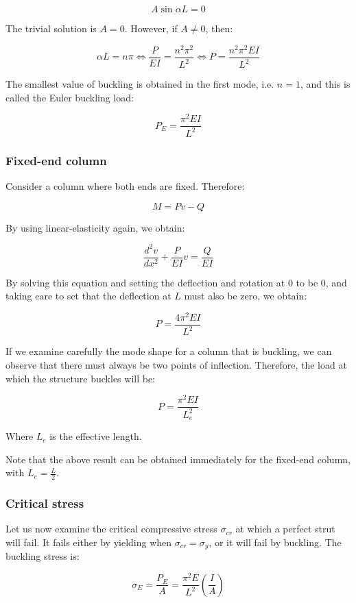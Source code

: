 \documentclass{article}
\begin{document}
\[ A\sin{\alpha L} = 0 \]

The trivial solution is $A = 0$. However, if $A \neq 0$, then:

\[ \alpha L = n\pi \iff \frac{P}{EI} = \frac{n^2\pi^2}{L^2} \iff P = \frac{n^2\pi^2EI}{L^2}\]

The smallest value of buckling is obtained in the first mode, i.e. $n = 1$, and this is called the Euler buckling load:

\[ P_E = \frac{\pi^2 EI}{L^2} \]

\subsubsection{Fixed-end column}

Consider a column where both ends are fixed. Therefore:

\[ M = Pv - Q \]

By using linear-elasticity again, we obtain:

\[ \frac{d^2v}{dx^2} + \frac{P}{EI}v = \frac{Q}{EI} \]

By solving this equation and setting the deflection and rotation at $0$ to be $0$, and taking care to set that the deflection at $L$ must also be zero, we obtain:

\[ P = \frac{4\pi^2EI}{L^2} \]

\begin{theorem}
    If we examine carefully the mode shape for a column that is buckling, we can observe that there must always be two points of inflection. Therefore, the load at which the structure buckles will be:

    \[ P = \frac{\pi^2EI}{L_e^2} \]

    Where $L_e$ is the effective length.
\end{theorem}

Note that the above result can be obtained immediately for the fixed-end column, with $L_e = \frac{L}{2}$. 

\subsubsection{Critical stress}

Let us now examine the critical compressive stress $\sigma_{cr}$ at which a perfect strut will fail. It fails either by yielding when $\sigma_{cr} = \sigma_y$, or it will fail by buckling. The buckling stress is:

\[ \sigma_E = \frac{P_E}{A} = \frac{\pi^2E}{L^2}\left(\frac{I}{A}\right) \]
\end{document}
